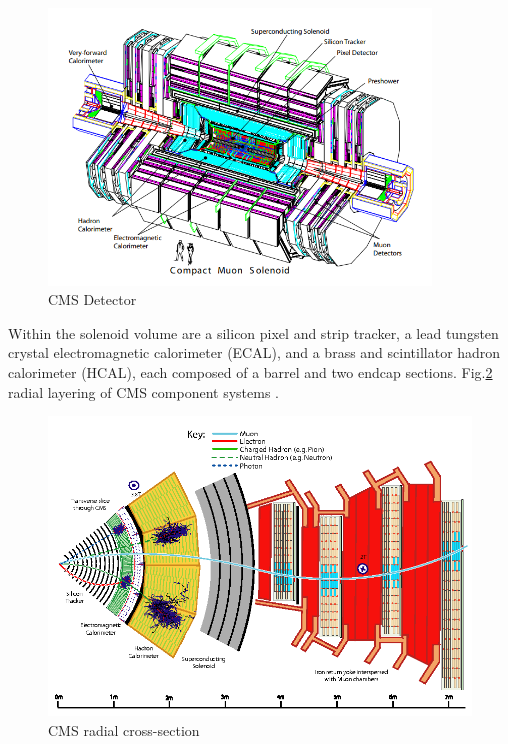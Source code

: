 \begin{figure}[]
\begin{centering}
\includegraphics[width=4in]{Chapter3/importfigs/fromCMS_DesignPaper_perspective.png}
\par\end{centering}
\caption{CMS Detector \cite{dEnterria:2007iyi} \label{fig:cmsCutOut}}
\end{figure}

Within the solenoid volume are a silicon pixel and strip tracker, a lead tungsten crystal electromagnetic calorimeter (ECAL), and a brass and scintillator hadron calorimeter (HCAL), each composed of a barrel and two endcap sections. Fig.\ref{fig:cmsCutOutZY} radial layering of CMS component systems \cite{10.1088/978-1-6817-4078-2ch4}.

\begin{figure}[]
\begin{centering}
\includegraphics[width=5.5in]{Chapter3/importfigs/Figure_001.png}
\par\end{centering}
\caption{CMS radial cross-section \cite{10.1088/978-1-6817-4078-2ch4} \label{fig:cmsCutOutZY}}
\end{figure}

